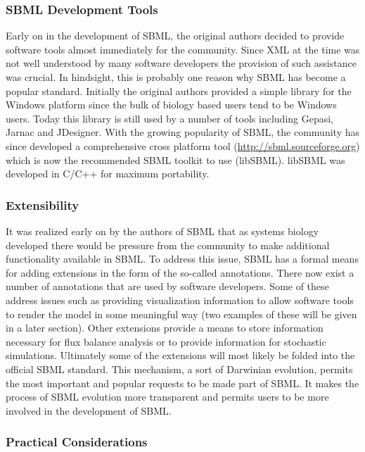 \documentclass[12pt]{article}
\begin{document}
\subsubsection{SBML Development Tools}

Early on in the development of SBML, the original authors decided
to provide software tools almost immediately for the community.
Since XML at the time was not well understood by many software
developers the provision of such assistance was crucial. In
hindsight, this is probably one reason why SBML has become
a popular standard. Initially the original authors provided a simple
library for the Windows platform since the bulk of biology based
users tend to be Windows users. Today this library is still used
by a number of tools including Gepasi, Jarnac and JDesigner. With
the growing popularity of SBML, the community has since developed
a comprehensive cross platform tool (\url{http://sbml.sourceforge.org}) which is now
the recommended SBML toolkit to use (libSBML). libSBML was developed in C/C++ for maximum
portability.

\subsubsection{Extensibility}

It was realized early on by the authors of SBML that as systems
biology developed there would be pressure from the community to
make additional functionality available in SBML. To address this
issue, SBML has a formal means for adding extensions in the form
of the so-called annotations. There now exist a number of annotations
that are used by software developers. Some of these address issues
such as providing visualization information to allow software
tools to render the model in some meaningful way (two examples of
these will be given in a later section). Other extensions provide
a means to store information necessary for flux balance analysis
or to provide information for stochastic simulations. Ultimately
some of the extensions will most likely be folded into the
official SBML standard. This mechanism, a sort of Darwinian
evolution, permits the most important and popular requests to be
made part of SBML. It makes the process of SBML evolution more
transparent and permits users to be more involved in the
development of SBML.

\subsubsection{Practical Considerations}
\end{document}
